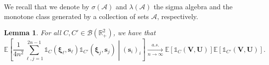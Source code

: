 \documentclass[11pt,a4paper,oneside]{article}
\newtheorem{lem}[thm]{Lemma}
\theoremstyle{definition}
\theoremstyle{remark}
\def\E{\mathbb{E}}
\def\R{\mathbb{R}}
\begin{document}
We recall that we denote by $\sigma\left(\mathcal A\right)$ and $\lambda\left(\mathcal A\right)$ the sigma algebra and  the monotone class generated by a collection of sets $\mathcal A$, respectively.


\begin{lem}\label{lem:ind_fnct}
For all $C,C'\in\mathcal{B}(\R_+^2)$, we have that 
\begin{equation}
\E\left[\frac{1}{4n^2}\sum_{\ell,j=1}^{2n-1}\mathds{1}_{C}\left(\bm \xi_\ell,\bm s_\ell\right)\mathds{1}_{C'}\left(\bm \xi_j,\bm s_j\right)\middle| ( \bm s_i)_i\right]\xrightarrow[n\to\infty]{a.s.} \E\left[\mathds{1}_{C}(\bm V,\bm U)\right]\E\left[\mathds{1}_{C'}(\bm V,\bm U)\right]\label{eq:second_mom_ind_bor}.
\end{equation}
\end{lem}
\end{document}
